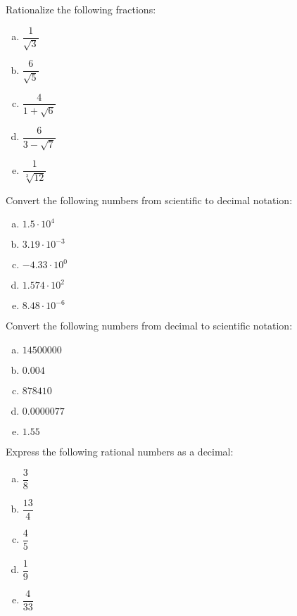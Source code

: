 \documentclass[11pt,letterpaper]{article}
\begin{document}
 Rationalize the following fractions:
\begin{enumerate}[(a)]
\item $\dfrac{1}{\sqrt{3}}$
\item $\dfrac{6}{\sqrt{5}}$
\item $\dfrac{4}{1 + \sqrt{6}}$
\item $\dfrac{6}{3 - \sqrt{7}}$
\item $\dfrac{1}{\sqrt[3]{12}}$
\end{enumerate}



\newpage



 Convert the following numbers from scientific to decimal notation:
\begin{enumerate}[(a)]
\item $1.5 \cdot 10^4$
\item $3.19 \cdot 10^{-3}$
\item $-4.33 \cdot 10^0$
\item $1.574 \cdot 10^2$
\item $8.48 \cdot 10^{-6}$
\end{enumerate}



\newpage



 Convert the following numbers from decimal to scientific notation:
\begin{enumerate}[(a)]
\item $14500000$
\item $0.004$
\item $878410$
\item $0.0000077$
\item $1.55$
\end{enumerate}



\newpage



 Express the following rational numbers as a decimal:
\begin{enumerate}[(a)]
\item $\dfrac{3}{8}$
\item $\dfrac{13}{4}$
\item $\dfrac{4}{5}$
\item $\dfrac{1}{9}$
\item $\dfrac{4}{33}$
\end{enumerate}
\end{document}
